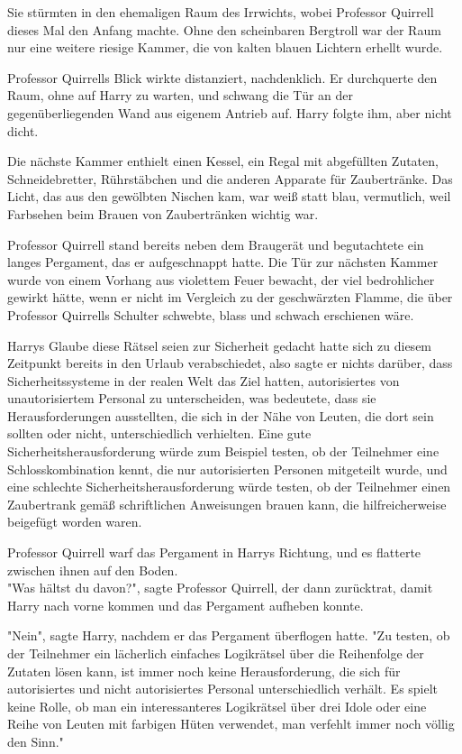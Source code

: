 {Sie stürmten in den ehemaligen Raum des Irrwichts, wobei Professor Quirrell dieses Mal den Anfang machte. Ohne den scheinbaren Bergtroll war der Raum nur eine weitere riesige Kammer, die von kalten blauen Lichtern erhellt wurde.

Professor Quirrells Blick wirkte distanziert, nachdenklich. Er durchquerte den Raum, ohne auf Harry zu warten, und schwang die Tür an der gegenüberliegenden Wand aus eigenem Antrieb auf. Harry folgte ihm, aber nicht dicht.

Die nächste Kammer enthielt einen Kessel, ein Regal mit abgefüllten Zutaten, Schneidebretter, Rührstäbchen und die anderen Apparate für Zaubertränke. Das Licht, das aus den gewölbten Nischen kam, war weiß statt blau, vermutlich, weil Farbsehen beim Brauen von Zaubertränken wichtig war.

Professor Quirrell stand bereits neben dem Braugerät und begutachtete ein langes Pergament, das er aufgeschnappt hatte. Die Tür zur nächsten Kammer wurde von einem Vorhang aus violettem Feuer bewacht, der viel bedrohlicher gewirkt hätte, wenn er nicht im Vergleich zu der geschwärzten Flamme, die über Professor Quirrells Schulter schwebte, blass und schwach erschienen wäre.

Harrys Glaube diese Rätsel seien zur Sicherheit gedacht hatte sich zu diesem Zeitpunkt bereits in den Urlaub verabschiedet, also sagte er nichts darüber, dass Sicherheitssysteme in der realen Welt das Ziel hatten, autorisiertes von unautorisiertem Personal zu unterscheiden, was bedeutete, dass sie Herausforderungen ausstellten, die sich in der Nähe von Leuten, die dort sein sollten oder nicht, unterschiedlich verhielten. Eine gute Sicherheitsherausforderung würde zum Beispiel testen, ob der Teilnehmer eine Schlosskombination kennt, die nur autorisierten Personen mitgeteilt wurde, und eine schlechte Sicherheitsherausforderung würde testen, ob der Teilnehmer einen Zaubertrank gemäß schriftlichen Anweisungen brauen kann, die hilfreicherweise beigefügt worden waren.

Professor Quirrell warf das Pergament in Harrys Richtung, und es flatterte zwischen ihnen auf den Boden.\\ "Was hältst du davon?", sagte Professor Quirrell, der dann zurücktrat, damit Harry nach vorne kommen und das Pergament aufheben konnte.

"Nein", sagte Harry, nachdem er das Pergament überflogen hatte. "Zu testen, ob der Teilnehmer ein lächerlich einfaches Logikrätsel über die Reihenfolge der Zutaten lösen kann, ist immer noch keine Herausforderung, die sich für autorisiertes und nicht autorisiertes Personal unterschiedlich verhält. Es spielt keine Rolle, ob man ein interessanteres Logikrätsel über drei Idole oder eine Reihe von Leuten mit farbigen Hüten verwendet, man verfehlt immer noch völlig den Sinn."

}
